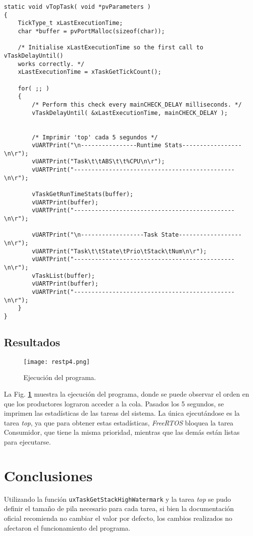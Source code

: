 \documentclass[12pt,a4paper]{article}
\begin{document}
\begin{lstlisting}[caption={Función `\emph{vTopTask}'.}, label={run}, language=Ce]
static void vTopTask( void *pvParameters )
{
	TickType_t xLastExecutionTime;
	char *buffer = pvPortMalloc(sizeof(char));

	/* Initialise xLastExecutionTime so the first call to vTaskDelayUntil()
	works correctly. */
	xLastExecutionTime = xTaskGetTickCount();

	for( ;; )
	{
		/* Perform this check every mainCHECK_DELAY milliseconds. */
		vTaskDelayUntil( &xLastExecutionTime, mainCHECK_DELAY );


		/* Imprimir 'top' cada 5 segundos */
		vUARTPrint("\n----------------Runtime Stats-----------------\n\r");
		vUARTPrint("Task\t\tABS\t\t%CPU\n\r");
		vUARTPrint("----------------------------------------------\n\r");

		vTaskGetRunTimeStats(buffer);
		vUARTPrint(buffer);
		vUARTPrint("----------------------------------------------\n\r");

		vUARTPrint("\n------------------Task State------------------\n\r");
		vUARTPrint("Task\t\tState\tPrio\tStack\tNum\n\r");
		vUARTPrint("----------------------------------------------\n\r");
		vTaskList(buffer);
		vUARTPrint(buffer);
		vUARTPrint("----------------------------------------------\n\r");
	}
}

\end{lstlisting}


\subsection{Resultados}
\label{results}

\begin{figure}[H]
  \centering
  \texttt{[image: restp4.png]}
  \caption{Ejecución del programa.}
  \label{exec}
\end{figure}

La Fig. \textbf{\ref{exec}} muestra la ejecución del programa, donde se puede
observar el orden en que los productores lograron acceder a la cola.
Pasados los 5 segundos, se imprimen las estadísticas de las tareas del sistema.
La única ejecutándose es la tarea \emph{top}, ya que para obtener estas
estadísticas, \emph{FreeRTOS} bloquea la tarea Consumidor, que tiene la misma
prioridad, mientras que las demás están listas para ejecutarse.

\section{Conclusiones}
\label{conc}
Utilizando la función \verb|uxTaskGetStackHighWatermark| y la tarea \emph{top}
se pudo definir el tamaño de pila necesario para cada tarea, si bien la
documentación oficial recomienda no cambiar el valor por defecto, los cambios
realizados no afectaron el funcionamiento del programa.
\end{document}
